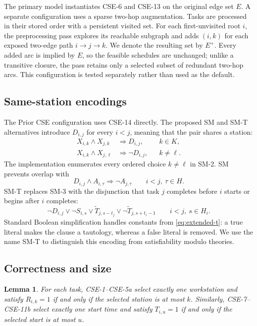 \documentclass[]{interact}
\theoremstyle{plain}
\newtheorem{lemma}[theorem]{Lemma}
\theoremstyle{definition}
\theoremstyle{remark}
\newcommand{\Eaug}{E^{+}}
\begin{document}
The primary model instantiates CSE-6 and CSE-13 on the original edge set $E$. A separate configuration uses a sparse two-hop augmentation. Tasks are processed in their stored order with a persistent visited set. For each first-unvisited root $i$, the preprocessing pass explores its reachable subgraph and adds $(i,k)$ for each exposed two-edge path $i\to j\to k$. We denote the resulting set by $\Eaug$. Every added arc is implied by $E$, so the feasible schedules are unchanged; unlike a transitive closure, the pass retains only a selected subset of redundant two-hop arcs. This configuration is tested separately rather than used as the default.

\subsection{Same-station encodings}
\label{sec:sm}

The Prior CSE configuration uses CSE-14 directly. The proposed SM and SM-T alternatives introduce $D_{i,j}$ for every $i<j$, meaning that the pair shares a station:
\begin{align}
X_{i,k}\wedge X_{j,k}&\Rightarrow D_{i,j}, && k\in K, \tag{SM-1}\\
X_{i,k}\wedge X_{j,\ell}&\Rightarrow\neg D_{i,j}, && k\neq\ell. \tag{SM-2}
\end{align}
The implementation enumerates every ordered choice $k\neq\ell$ in SM-2. SM prevents overlap with
\begin{equation}
D_{i,j}\wedge A_{i,\tau}\Rightarrow\neg A_{j,\tau}
\qquad i<j,\ \tau\in H.
\tag{SM-3}
\end{equation}
SM-T replaces SM-3 with the disjunction that task $j$ completes before $i$ starts or begins after $i$ completes:
\begin{equation}
\neg D_{i,j}\vee\neg S_{i,s}\vee
\widetilde T_{j,s-t_j}\vee
\neg\widetilde T_{j,s+t_i-1}
\qquad i<j,\ s\in H_i.
\tag{SM-T}
\label{eq:smt}
\end{equation}
Standard Boolean simplification handles constants from \eqref{eq:extended-t}: a true literal makes the clause a tautology, whereas a false literal is removed. We use the name SM-T to distinguish this encoding from satisfiability modulo theories.

\subsection{Correctness and size}

\begin{lemma}
For each task, CSE-1--CSE-5a select exactly one workstation and satisfy $R_{i,k}=1$ if and only if the selected station is at most $k$. Similarly, CSE-7--CSE-11b select exactly one start time and satisfy $T_{i,u}=1$ if and only if the selected start is at most $u$.
\end{lemma}
\end{document}

